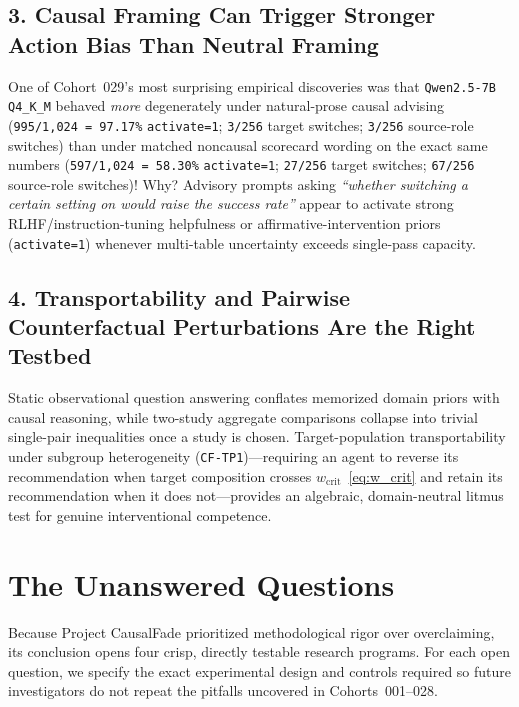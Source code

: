\section{3. Causal Framing Can Trigger Stronger Action Bias Than Neutral Framing}
One of Cohort~029's most surprising empirical discoveries was that \texttt{Qwen2.5-7B Q4\_K\_M} behaved \emph{more} degenerately under natural-prose causal advising (\texttt{995/1,024 = 97.17\%} \texttt{activate=1}; \texttt{3/256} target switches; \texttt{3/256} source-role switches) than under matched noncausal scorecard wording on the exact same numbers (\texttt{597/1,024 = 58.30\%} \texttt{activate=1}; \texttt{27/256} target switches; \texttt{67/256} source-role switches)! Why? Advisory prompts asking \emph{``whether switching a certain setting on would raise the success rate''} appear to activate strong RLHF/instruction-tuning helpfulness or affirmative-intervention priors (\texttt{activate=1}) whenever multi-table uncertainty exceeds single-pass capacity.

\section{4. Transportability and Pairwise Counterfactual Perturbations Are the Right Testbed}
Static observational question answering conflates memorized domain priors with causal reasoning, while two-study aggregate comparisons collapse into trivial single-pair inequalities once a study is chosen. Target-population transportability under subgroup heterogeneity (\texttt{CF-TP1})---requiring an agent to reverse its recommendation when target composition crosses $w_{\mathrm{crit}}$~\eqref{eq:w_crit} and retain its recommendation when it does not---provides an algebraic, domain-neutral litmus test for genuine interventional competence.

\chapter{The Unanswered Questions}\label{ch:unanswered}

Because Project CausalFade prioritized methodological rigor over overclaiming, its conclusion opens four crisp, directly testable research programs. For each open question, we specify the exact experimental design and controls required so future investigators do not repeat the pitfalls uncovered in Cohorts~001--028.

